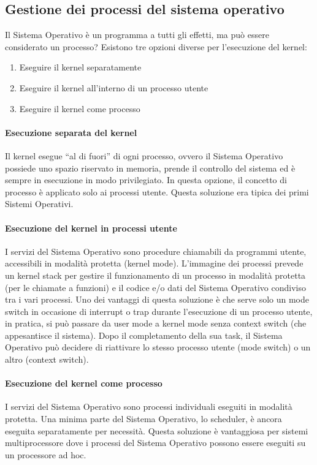 \documentclass[a4paper]{article}
\begin{document}
\subsection{Gestione dei processi del sistema operativo}
Il Sistema Operativo è un programma a tutti gli effetti, ma può essere considerato un processo? Esistono tre opzioni diverse per l'esecuzione del kernel:
\begin{enumerate}
   \item Eseguire il kernel separatamente
   \item Eseguire il kernel all'interno di un processo utente
   \item Eseguire il kernel come processo
\end{enumerate}

\paragraph{Esecuzione separata del kernel} Il kernel esegue ``al di fuori'' di ogni processo, ovvero il Sistema Operativo possiede uno spazio riservato in memoria, prende il controllo del sistema ed è sempre in esecuzione in modo privilegiato. In questa opzione, il concetto di processo è applicato solo ai processi utente. Questa soluzione era tipica dei primi Sistemi Operativi.

\paragraph{Esecuzione del kernel in processi utente} I servizi del Sistema Operativo sono procedure chiamabili da programmi utente, accessibili in modalità protetta (kernel mode). L'immagine dei processi prevede un kernel stack per gestire il funzionamento di un processo in modalità protetta (per le chiamate a funzioni) e il codice e/o dati del Sistema Operativo condiviso tra i vari processi.
Uno dei vantaggi di questa soluzione è che serve solo un mode switch in occasione di interrupt o trap durante l'esecuzione di un processo utente, in pratica, si può passare da user mode a kernel mode senza context switch (che appesantisce il sistema). Dopo il completamento della sua task, il Sistema Operativo può decidere di riattivare lo stesso processo utente (mode switch) o un altro (context switch).

\paragraph{Esecuzione del kernel come processo} I servizi del Sistema Operativo sono processi individuali eseguiti in modalità protetta. Una minima parte del Sistema Operativo, lo scheduler, è ancora eseguita separatamente per necessità.
Questa soluzione è vantaggiosa per sistemi multiprocessore dove i processi del Sistema Operativo possono essere eseguiti su un processore ad hoc.
\end{document}
